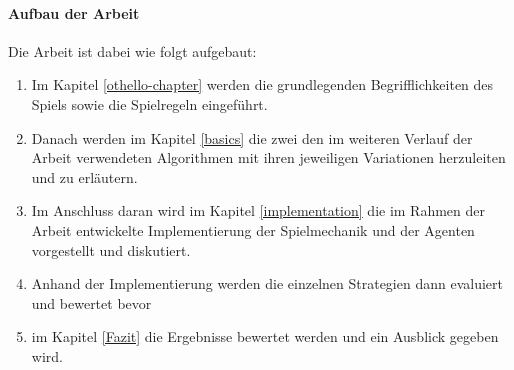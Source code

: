 \paragraph{Aufbau der Arbeit}
Die Arbeit ist dabei wie folgt aufgebaut:
\begin{enumerate}
\item Im Kapitel \ref{othello-chapter} werden die grundlegenden Begrifflichkeiten des Spiels sowie die Spielregeln eingeführt.
\item Danach werden im Kapitel \ref{basics} die zwei den im weiteren Verlauf der Arbeit verwendeten Algorithmen mit ihren jeweiligen Variationen herzuleiten und zu erläutern.
\item Im Anschluss daran wird im Kapitel \ref{implementation} die im Rahmen der Arbeit entwickelte Implementierung der Spielmechanik und der Agenten vorgestellt und diskutiert.
\item Anhand der Implementierung werden die einzelnen Strategien dann evaluiert und bewertet bevor
\item im Kapitel \ref{Fazit} die Ergebnisse bewertet werden und ein Ausblick gegeben wird.
\end{enumerate}
